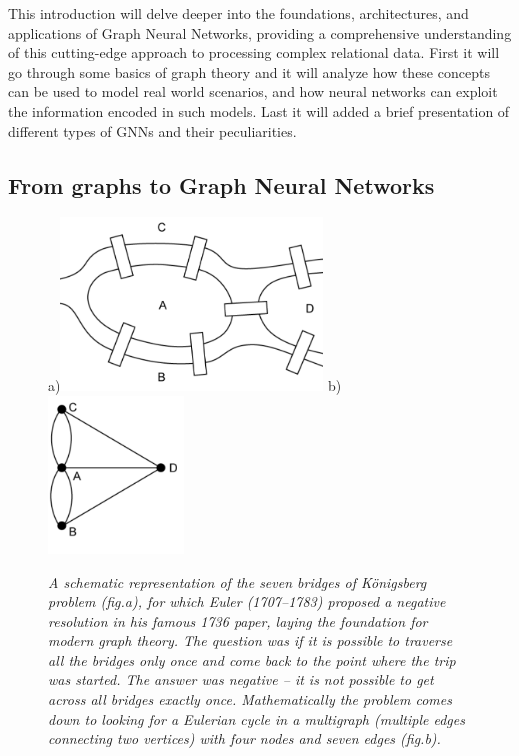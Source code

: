 \documentclass[binding=0.6cm]{sapthesis}
\begin{document}
This introduction will delve deeper into the foundations, architectures, and applications of Graph Neural Networks, providing a comprehensive understanding of this cutting-edge approach to processing complex relational data. First it will go through some basics of graph theory and it will analyze how these concepts can be used to model real world scenarios, and how neural networks  can exploit the information encoded in such models. Last it will added a brief presentation of different types of GNNs and their peculiarities.

\subsection{From graphs to Graph Neural Networks}
\label{sec:bg.gnn.graph-base}

\begin{figure}
    \centering
    \footnotesize a)\includegraphics[width=0.62\textwidth]{imgs/background/euler-bridges-01.png}
    \footnotesize b)\includegraphics[width=0.32\textwidth]{imgs/background/euler-bridges-03.png}
    \caption{\textit{A schematic representation of the seven bridges of Königsberg problem (fig.a), for which Euler (1707–1783) proposed a negative resolution in his famous 1736 paper, laying the foundation for modern graph theory. The question was if it is possible to traverse all the bridges only once and come back to the point where the trip was started. The answer was negative – it is not possible to get across all bridges exactly once. Mathematically the problem comes down to looking for a Eulerian cycle in a multigraph (multiple edges connecting two vertices) with four nodes and seven edges (fig.b).}}
    \label{fig:bg.gnn.konigsbridge}
\end{figure}
\end{document}
